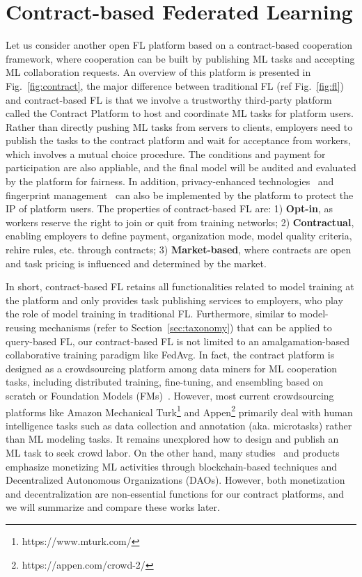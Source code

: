 \section{Contract-based Federated Learning}
Let us consider another open FL platform based on a contract-based cooperation framework, where cooperation can be built by publishing ML tasks and accepting ML collaboration requests.
An overview of this platform is presented in Fig.~\ref{fig:contract}, the major difference between traditional FL (ref Fig.~\ref{fig:fl}) and contract-based FL is that we involve a trustworthy third-party platform called the Contract Platform to host and coordinate ML tasks for platform users.
Rather than directly pushing ML tasks from servers to clients, employers need to publish the tasks to the contract platform and wait for acceptance from workers, which involves a mutual choice procedure. 
The conditions and payment for participation are also appliable, and the final model will be audited and evaluated by the platform for fairness.
In addition, privacy-enhanced technologies~\cite{hesamifard2018privacy} and fingerprint management~\cite{chen2022copy} can also be implemented by the platform to protect the IP of platform users.
The properties of contract-based FL are: 1) \textbf{Opt-in}, as workers reserve the right to join or quit from training networks; 2) \textbf{Contractual}, enabling employers to define payment, organization mode, model quality criteria, rehire rules, etc. through contracts; 3) \textbf{Market-based}, where contracts are open and task pricing is influenced and determined by the market.

In short, contract-based FL retains all functionalities related to model training at the platform and only provides task publishing services to employers, who play the role of model training in traditional FL.
Furthermore, similar to model-reusing mechanisms (refer to Section~\ref{sec:taxonomy}) that can be applied to query-based FL, our contract-based FL is not limited to an amalgamation-based collaborative training paradigm like FedAvg.
In fact, the contract platform is designed as a crowdsourcing platform among data miners for ML cooperation tasks, including distributed training, fine-tuning, and ensembling based on scratch or Foundation Models (FMs)~\cite{yuan2022decentralized}.
However, most current crowdsourcing platforms like Amazon Mechanical Turk\footnote{https://www.mturk.com/} and Appen\footnote{https://appen.com/crowd-2/} primarily deal with human intelligence tasks such as data collection and annotation (aka. microtasks) rather than ML modeling tasks. 
It remains unexplored how to design and publish an ML task to seek crowd labor.
On the other hand, many studies~\cite{dias2022blocklearning, blythman2022decentralized, deng2021flex, guo2023blockchain, batool2022fl} and products~\cite{steeves2022incentivizing, ziller2021pysyft, mcconaghy2022ocean} emphasize monetizing ML activities through blockchain-based techniques and Decentralized Autonomous Organizations (DAOs). 
However, both monetization and decentralization are non-essential functions for our contract platforms, and we will summarize and compare these works later.

